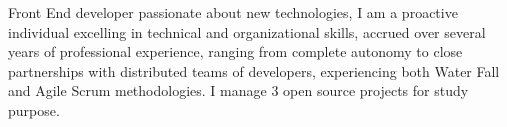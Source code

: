 

\begin{cvparagraph}

Front End developer passionate about new technologies, I am a proactive individual excelling in technical and organizational skills, accrued over several years of professional experience, ranging from complete autonomy to close partnerships with distributed teams of developers, experiencing both Water Fall and Agile Scrum methodologies.
I manage 3 open source projects for study purpose.
\end{cvparagraph}

